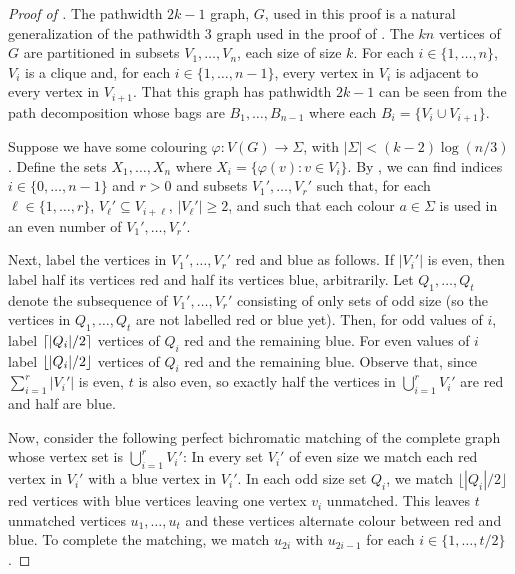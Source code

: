 \documentclass{llncs}
\begin{document}
\begin{proof}[Proof of ]
The pathwidth $2k-1$ graph, $G$, used in this proof is a natural
generalization of the pathwidth $3$ graph used in the proof of
.  The $kn$ vertices of $G$ are partitioned in subsets
$V_1,\ldots,V_n$, each size of size $k$.  For each $i\in\{1,\ldots,n\}$,
$V_i$ is a clique and, for each $i\in\{1,\ldots,n-1\}$, every
vertex in $V_i$ is adjacent to every vertex in $V_{i+1}$.  That this
graph has pathwidth $2k-1$ can be seen from the path decomposition whose
bags are
$B_1,\ldots,B_{n-1}$ where each $B_i=\{V_i\cup V_{i+1}\}$.

Suppose we have some colouring $\varphi:V(G)\to\Sigma$, with
$|\Sigma|<(k-2)\log(n/3)$.  Define the sets $X_1,\ldots,X_n$ where
$X_i=\{\varphi(v): v\in V_i\}$.  By , we can find indices
$i\in\{0,\ldots,n-1\}$ and $r>0$ and subsets $V_1',\ldots,V_{r}'$ such
that, for each $\ell\in\{1,\ldots,r\}$,  $V_\ell'\subseteq V_{i+\ell}$, $|V_\ell'|\ge 2$,
and such that each colour $a\in\Sigma$ is used in an even number of
$V_1',\ldots,V_r'$.

Next, label the vertices in $V_1',\ldots,V_r'$ red and blue as
follows.  If $|V_i'|$ is even, then label half its vertices red and
half its vertices blue, arbitrarily.  Let $Q_1,\ldots,Q_t$ denote the
subsequence of $V_1',\ldots,V_r'$ consisting of only sets of odd size
(so the vertices in $Q_1,\ldots,Q_t$ are not labelled red or blue yet).
Then, for odd values of $i$, label ${\lceil |Q_i|/2 \rceil}$ vertices
of $Q_i$ red and the remaining blue.  For even values of $i$ label
${\lfloor |Q_i|/2 \rfloor}$ vertices of $Q_i$ red and the remaining blue.
Observe that, since $\sum_{i=1}^r|V_i'|$ is even, $t$ is also even,
so exactly half the vertices in $\bigcup_{i=1}^r V_i'$ are red and half
are blue.

Now, consider the following perfect bichromatic matching of the complete
graph whose vertex set is
$\bigcup_{i=1}^r V_i'$: In every set $V_i'$ of even size we match each
red vertex in $V_i'$ with a blue vertex in $V_i'$.  In each odd size set
$Q_i$, we match $\lfloor|Q_i|/2\rfloor$ red vertices with blue vertices
leaving one vertex $v_i$ unmatched.  This leaves $t$ unmatched vertices
$u_1,\ldots,u_t$ and these vertices alternate colour between red and
blue. To complete the matching, we match $u_{2i}$ with $u_{2i-1}$ for
each $i\in\{1,\ldots,t/2\}$.


\end{proof}
\end{document}
